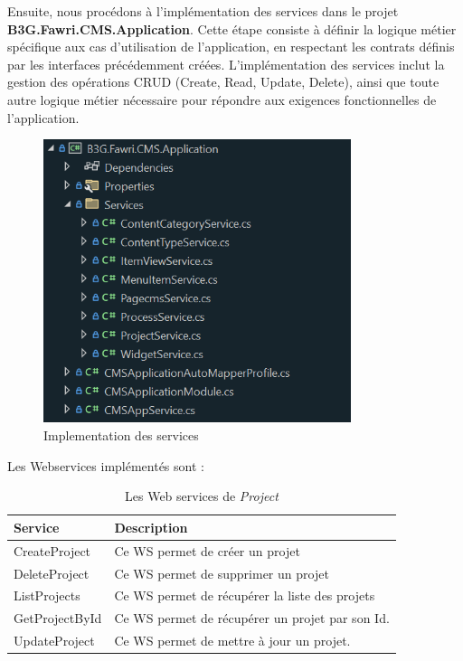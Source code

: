 Ensuite, nous procédons à l'implémentation des services dans le projet \textbf{B3G.Fawri.CMS.Application}. Cette étape consiste à définir la logique métier spécifique aux cas d'utilisation de l'application, en respectant les contrats définis par les interfaces précédemment créées. L'implémentation des services inclut la gestion des opérations CRUD (Create, Read, Update, Delete), ainsi que toute autre logique métier nécessaire pour répondre aux exigences fonctionnelles de l'application.

\begin{figure}[H]
    \centering
    \includegraphics[width=9cm]{Figures/services impl.PNG}
    \caption{Implementation des services}
\end{figure}


Les Webservices implémentés sont :


\begin{table}[H]
    \centering
    \begin{tabular}{|m{5cm}|m{10cm}|}
        \hline
        \textbf{Service} & \textbf{Description}                            \\
        \hline
        CreateProject    & Ce WS permet de créer un projet                 \\
        \hline
        DeleteProject    & Ce WS permet de supprimer un projet             \\
        \hline
        ListProjects     & Ce WS permet de récupérer la liste des projets  \\
        \hline
        GetProjectById   & Ce WS permet de récupérer un projet par son Id. \\
        \hline
        UpdateProject    & Ce WS permet de mettre à jour un projet.        \\
        \hline
    \end{tabular}
    \caption{Les Web services de \textit{Project}}
\end{table}



